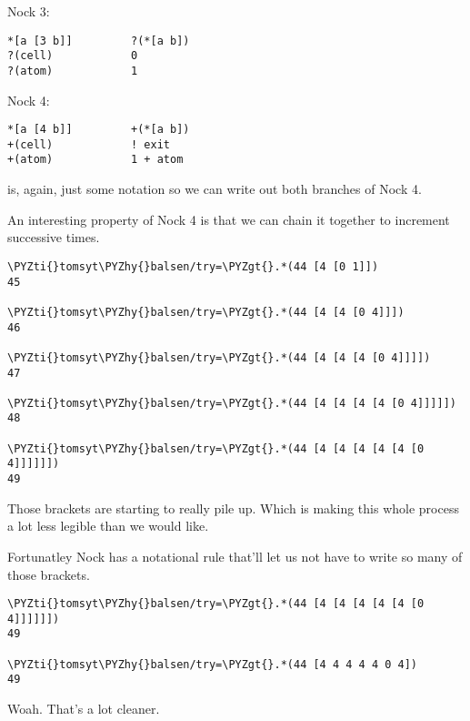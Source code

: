 Nock 3:
\begin{framed_shaded}
\begin{Verbatim}[fontsize=\relsize{-2.5},fontseries=b,commandchars=\\\{\}]
*[a [3 b]]         ?(*[a b])
?(cell)            0
?(atom)            1
\end{Verbatim}
\end{framed_shaded}
Nock 4:
\begin{framed_shaded}
\begin{Verbatim}[fontsize=\relsize{-2.5},fontseries=b,commandchars=\\\{\}]
*[a [4 b]]         +(*[a b])
+(cell)            ! exit
+(atom)            1 + atom
\end{Verbatim}
\end{framed_shaded}
 is, again, just some notation so we can write out both branches of Nock
4.

An interesting property of Nock 4 is that  we can chain it together to
increment successive times.
\begin{framed_shaded}
\begin{Verbatim}[fontsize=\relsize{-2.5},fontseries=b,commandchars=\\\{\}]
\PYZti{}tomsyt\PYZhy{}balsen/try=\PYZgt{}.*(44 [4 [0 1]])
45

\PYZti{}tomsyt\PYZhy{}balsen/try=\PYZgt{}.*(44 [4 [4 [0 4]]])
46

\PYZti{}tomsyt\PYZhy{}balsen/try=\PYZgt{}.*(44 [4 [4 [4 [0 4]]]])
47

\PYZti{}tomsyt\PYZhy{}balsen/try=\PYZgt{}.*(44 [4 [4 [4 [4 [0 4]]]]])
48

\PYZti{}tomsyt\PYZhy{}balsen/try=\PYZgt{}.*(44 [4 [4 [4 [4 [4 [0 4]]]]]])
49
\end{Verbatim}
\end{framed_shaded}
Those brackets are starting to really pile up. Which is making this whole
process a lot less legible than we would like.

Fortunatley Nock has a notational rule that'll let us not have to write so many
of those brackets.
\begin{framed_shaded}
\begin{Verbatim}[fontsize=\relsize{-2.5},fontseries=b,commandchars=\\\{\}]
\PYZti{}tomsyt\PYZhy{}balsen/try=\PYZgt{}.*(44 [4 [4 [4 [4 [4 [0 4]]]]]])
49

\PYZti{}tomsyt\PYZhy{}balsen/try=\PYZgt{}.*(44 [4 4 4 4 4 0 4])
49
\end{Verbatim}
\end{framed_shaded}
Woah. That's a lot cleaner. 

